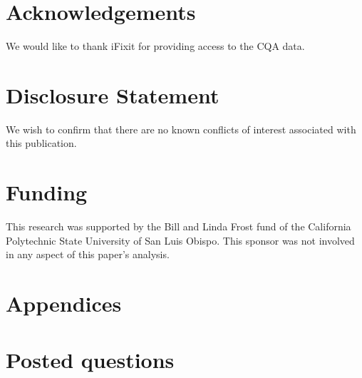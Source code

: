 \documentclass[]{interact}\usepackage[]{graphicx}\usepackage[]{color}
\begin{document}
% 

% 

\section*{Acknowledgements}

 We would like to thank iFixit for providing access to the CQA data.
 
\section*{Disclosure Statement}

We wish to confirm that there are no known conflicts of interest associated with this publication.

\section*{Funding}
 
This research was supported by the Bill and Linda Frost fund of the California Polytechnic State University of San Luis Obispo. This sponsor was not involved in any aspect of this paper's analysis.






\section{Appendices}

\appendix

\section{Posted questions}
\end{document}
